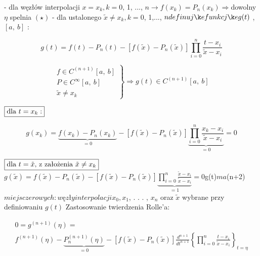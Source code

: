 \begin{frame}

- dla węzłów interpolacji $x=x_{k}, k=0$, 1, ..., $n \rightarrow f(x_{k})=P_{n}(x_{k})\Rightarrow $dowolny $\eta$ spelnia $(\star)$ \newline
- dla ustalonego $\tilde{x}\neq x_{k}, k=0$, 1,..., $n\\
definuję funkcję g(t)$ , $[a,\ b]$ :

$$g(t)=f(t)-P_{n}(t)-[f(\tilde{x})-P_{n}(\tilde{x})]\prod_{i=0}^{n}\frac{t-x_{i}}{\tilde{x}-x_{i}}$$

$$
 \left. \begin{array}{ll}
f\in C^{(n+1)}[a,\ b] \\
P\in C^{\infty}[a,\ b]\\
\tilde{x}\neq x_{k}
\end{array} \right \} \Rightarrow g(t)\in C^{(n+1)}[a,\ b]
$$

$\fbox{dla $t=x_{k}:$}$

$$g(x_{k})=\underbrace{f(x_{k})-P_{n}(x_{k})}_{=0}-[f(\tilde{x})-P_{n}(\tilde{x})]\underbrace{\prod_{i=0}^{n}\frac{x_{k}-x_{i}}{\tilde{x}-x_{i}}}_{=0}=0$$

\end{frame}

\begin{frame}
$\fbox{dla $t=\tilde{x}$, z założenia $\tilde{x} \neq x_k$}\\
$$
g(\tilde{x})=f(\tilde{x})-P_{n}(\tilde{x})-[f(\tilde{x})-P_{n}(\tilde{x})]\underbrace{\prod_{i=0}^{n}\frac{\tilde{x}-x_{i}}{\tilde{x}-x_{i}}}_{=1}=0
$$
$\Rightarrow g(t)$ ma $(n+2)$ miejsc zerowych: węzły interpolacji x_{0}, x_{1}$, . . . , $x_{n}$ oraz $\tilde{x}$ wybrane przy definiowaniu $g(t)$ \newline \newline
Zastosowanie twierdzenia Rolle'a:


$$\begin{array}{ll}
0=g^{(n+1)}(\displaystyle \eta)= \\
f^{(n+1)}(\eta)-\underbrace{P_{n}^{(n+1)}(\eta)}_{=0}-[f(\tilde{x})-P_{n}(\tilde{x})]\frac{d^{n+1}}{dt^{n+1}} \left \{\prod_{i=0}^{n}\frac{t-x_{i}}{\tilde{x}-x_{i}} \right \}_{t=\eta}  \end{array}$$


 \end{frame}


